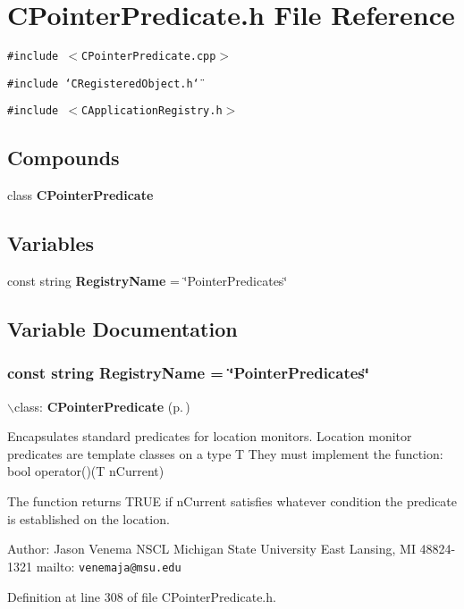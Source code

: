 \section{CPointer\-Predicate.h File Reference}
\label{CPointerPredicate_8h}
{\tt \#include $<$CPointer\-Predicate.cpp$>$}\par
{\tt \#include \char`\"{}CRegistered\-Object.h\char`\"{}}\par
{\tt \#include $<$CApplication\-Registry.h$>$}\par
\subsection*{Compounds}
\begin{CompactItemize}
\item 
class {\bf CPointer\-Predicate}
\end{CompactItemize}
\subsection*{Variables}
\begin{CompactItemize}
\item 
const string {\bf Registry\-Name} = \char`\"{}Pointer\-Predicates\char`\"{}
\end{CompactItemize}


\subsection{Variable Documentation}
\subsubsection{\setlength{\rightskip}{0pt plus 5cm}const string Registry\-Name = \char`\"{}Pointer\-Predicates\char`\"{}\hspace{0.3cm}{\tt  [static]}}\label{CPointerPredicate_8h_a0}


$\backslash$class: {\bf CPointer\-Predicate} {\rm (p.\,\pageref{classCPointerPredicate})}

Encapsulates standard predicates for location monitors. Location monitor predicates are template classes on a type T They must implement the function: bool operator()(T n\-Current)

The function returns TRUE if n\-Current satisfies whatever condition  the predicate is established on the location.

Author: Jason Venema NSCL Michigan State University East Lansing, MI 48824-1321 mailto: {\tt venemaja@msu.edu} 

Definition at line 308 of file CPointer\-Predicate.h.